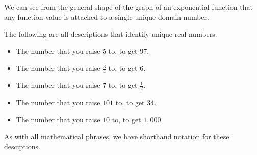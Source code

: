 \documentclass{ximera}
\begin{document}
\begin{image}
\end{image}





We can see from the general shape of the graph of an exponential function that any function value is attached to a single unique domain number. \\



\begin{example}
The following are all descriptions that identify unique real numbers.

\begin{itemize}
\item The number that you raise $5$ to, to get $97$.
\item The number that you raise $\frac{3}{4}$ to, to get $6$.
\item The number that you raise $7$ to, to get $\frac{1}{2}$.
\item The number that you raise $101$ to, to get $34$.
\item The number that you raise $10$ to, to get $1,000$.
\end{itemize}

\end{example}



As with all mathematical phrases, we have shorthand notation for these desciptions.
\end{document}
